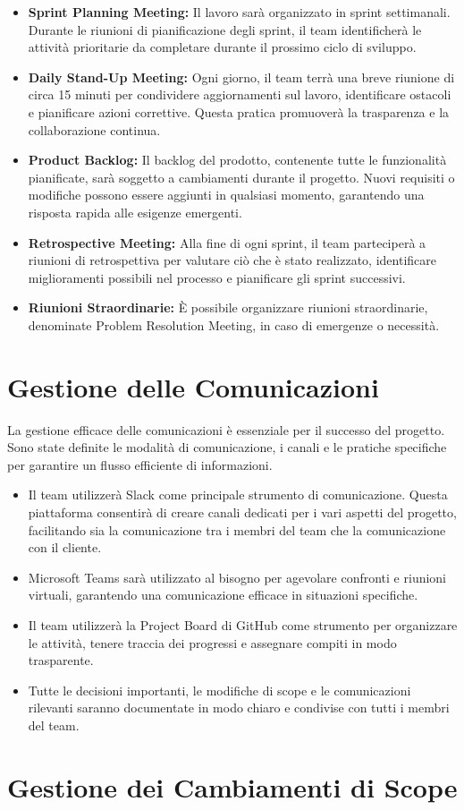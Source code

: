 \begin{itemize}
    \item \textbf{Sprint Planning Meeting:} Il lavoro sarà organizzato in sprint settimanali. Durante le riunioni di pianificazione degli sprint, il team identificherà le attività prioritarie da completare durante il prossimo ciclo di sviluppo.
    \item \textbf{Daily Stand-Up Meeting:} Ogni giorno, il team terrà una breve riunione di circa 15 minuti per condividere aggiornamenti sul lavoro, identificare ostacoli e pianificare azioni correttive. Questa pratica promuoverà la trasparenza e la collaborazione continua.
    \item \textbf{Product Backlog:} Il backlog del prodotto, contenente tutte le funzionalità pianificate, sarà soggetto a cambiamenti durante il progetto. Nuovi requisiti o modifiche possono essere aggiunti in qualsiasi momento, garantendo una risposta rapida alle esigenze emergenti.
    \item \textbf{Retrospective Meeting:} Alla fine di ogni sprint, il team parteciperà a riunioni di retrospettiva per valutare ciò che è stato realizzato, identificare miglioramenti possibili nel processo e pianificare gli sprint successivi.
    \item \textbf{Riunioni Straordinarie:} È possibile organizzare riunioni straordinarie, denominate Problem Resolution Meeting, in caso di emergenze o necessità.
\end{itemize}

\section{Gestione delle Comunicazioni}
La gestione efficace delle comunicazioni è essenziale per il successo del progetto. Sono state definite le modalità di comunicazione, i canali e le pratiche specifiche per garantire un flusso efficiente di informazioni.

\begin{itemize}
    \item Il team utilizzerà Slack come principale strumento di comunicazione. Questa piattaforma consentirà di creare canali dedicati per i vari aspetti del progetto, facilitando sia la comunicazione tra i membri del team che la comunicazione con il cliente.
    \item Microsoft Teams sarà utilizzato al bisogno per agevolare confronti e riunioni virtuali, garantendo una comunicazione efficace in situazioni specifiche.
    \item Il team utilizzerà la Project Board di GitHub come strumento per organizzare le attività, tenere traccia dei progressi e assegnare compiti in modo trasparente.
    \item Tutte le decisioni importanti, le modifiche di scope e le comunicazioni rilevanti saranno documentate in modo chiaro e condivise con tutti i membri del team.
\end{itemize}


\section{Gestione dei Cambiamenti di Scope}
